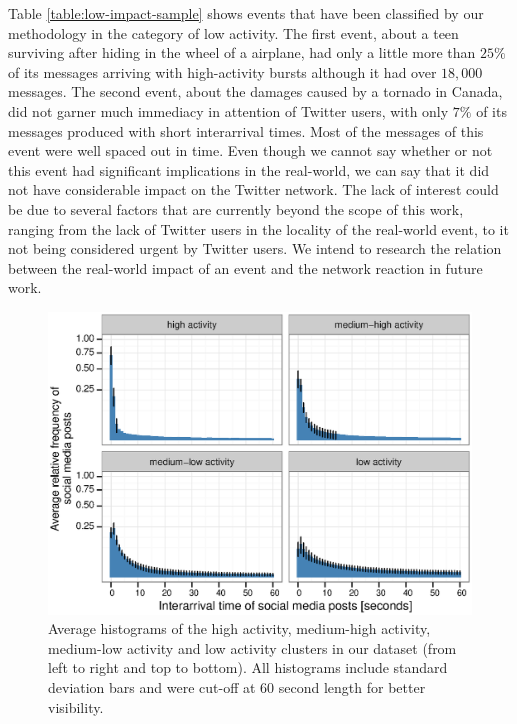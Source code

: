 Table \ref{table:low-impact-sample} shows events that have been classified by
our methodology in the category of low activity. 
%
The first event, about a teen surviving after hiding in the wheel of a airplane,
had only a little more than $25\%$ of its messages arriving with high-activity
bursts although it had over $18,000$ messages.  
%
The second event, about the damages caused by a tornado in Canada, did not
garner much immediacy in attention of Twitter users, with only $7\%$ of its
messages produced with short interarrival times. 
%
Most of the messages of this event were well spaced out in time. 
%
Even though we cannot say whether or not this event had significant implications
in the real-world, we can say that it did not have considerable impact on the
Twitter network. 
%
The lack of interest could be due to several factors that are currently beyond
the scope of this work, ranging from the lack of Twitter users in the locality
of the real-world event, to it not being considered urgent by Twitter users. 
%
We intend to research the relation between the real-world impact of an event and
the network reaction in future work.


\begin{figure}[!htb]
  \centering
   \includegraphics[width=\textwidth]{figures/high-activity/fig4}
  \caption{Average histograms of the high activity, medium-high activity,
      medium-low activity and low activity clusters in our dataset (from left to
      right and top to bottom). All histograms include standard deviation bars
      and were cut-off at 60 second length for better visibility.
    }\label{fig:hi:avg-hist}
\end{figure}

